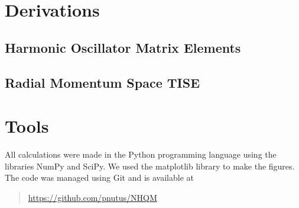 \documentclass[12pt,a4paper]{report}
\begin{document}
\appendix


\chapter{Derivations}

\section{Harmonic Oscillator Matrix Elements}
\label{sec:HO matrix elements}



\section{Radial Momentum Space TISE}
\label{sec:radial mom space TISE}



\chapter{Tools}

All calculations were made in the Python programming language 
using the libraries NumPy and SciPy. We used the matplotlib 
library to make the figures. The code was managed using Git 
and is available at
\begin{quote}
  \url{https://github.com/pnutus/NHQM}
\end{quote}


{}
\end{document}
